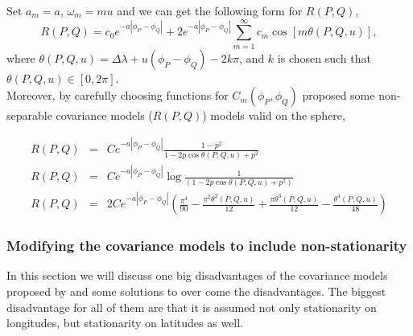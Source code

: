 		
	Set $a_m=a$, $\omega_m=mu$ and we can get the following form for $R(P,Q)$,
	\[
		R(P,Q)=c_0e^{-a|\phi_P-\phi_Q|}+2e^{-a|\phi_P-\phi_Q|} \sum_{m=1}^{\infty}c_m\cos[m\theta(P,Q,u)],
	\]
	where $\theta(P,Q,u)=\Delta\lambda+u(\phi_P-\phi_Q)-2k\pi$, and $k$ is chosen such that $\theta(P,Q,u)\in[0,2\pi]$.\\
		
		
	Moreover, by carefully choosing functions for $C_m(\phi_P, \phi_Q)$ \cite{Huang2012} proposed some non-separable covariance models ($R(P,Q)$) models valid on the sphere,
		
	\begin{eqnarray}
		R(P,Q) &=& Ce^{-a|\phi_P-\phi_Q|} \frac{1-p^2}{1-2p \cos\theta(P,Q,u)+p^2} \label{model1} \\
		R(P,Q) &=& Ce^{-a|\phi_P-\phi_Q|} \log\frac{1}{(1-2p\cos\theta(P,Q,u) + p^2)} \label{model2} \\
		R(P,Q) &=& 2Ce^{-a|\phi_P-\phi_Q|}\left(\frac{\pi^4}{90}-\frac{\pi^2\theta^2(P,Q,u)}{12}+\frac{\pi\theta^3(P,Q,u)}{12}-\frac{\theta^4(P,Q,u)}{48}\right) \label{model3}
	\end{eqnarray}
		
	
		
	\subsubsection{Modifying the covariance models to include non-stationarity}
		
	In this section we will discuss one big disadvantages of the covariance models proposed by \cite{Huang2012} and some solutions to over come the disadvantages. The biggest disadvantage for all of them are that it is  assumed not only stationarity on longitudes, but stationarity on latitudes as well. \\
	
